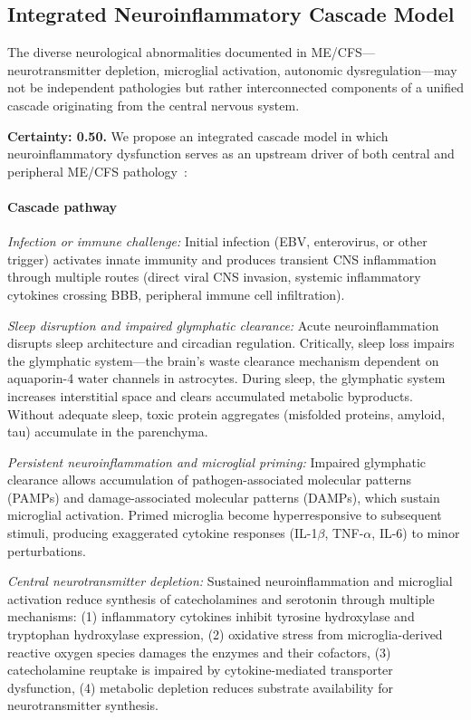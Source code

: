 \subsection{Integrated Neuroinflammatory Cascade Model}

The diverse neurological abnormalities documented in ME/CFS—neurotransmitter depletion, microglial activation, autonomic dysregulation—may not be independent pathologies but rather interconnected components of a unified cascade originating from the central nervous system.

\begin{hypothesis}
\label{hyp:cascade-neuroinflammatory}
\textbf{Certainty: 0.50.} We propose an integrated cascade model in which neuroinflammatory dysfunction serves as an upstream driver of both central and peripheral ME/CFS pathology~\cite{MCMC2024Neurometabolic,NIH2024MECFSRoadmap}:

\paragraph{Cascade pathway}

\textit{Infection or immune challenge:} Initial infection (EBV, enterovirus, or other trigger) activates innate immunity and produces transient CNS inflammation through multiple routes (direct viral CNS invasion, systemic inflammatory cytokines crossing BBB, peripheral immune cell infiltration).

\textit{Sleep disruption and impaired glymphatic clearance:} Acute neuroinflammation disrupts sleep architecture and circadian regulation. Critically, sleep loss impairs the glymphatic system---the brain's waste clearance mechanism dependent on aquaporin-4 water channels in astrocytes. During sleep, the glymphatic system increases interstitial space and clears accumulated metabolic byproducts. Without adequate sleep, toxic protein aggregates (misfolded proteins, amyloid, tau) accumulate in the parenchyma.

\textit{Persistent neuroinflammation and microglial priming:} Impaired glymphatic clearance allows accumulation of pathogen-associated molecular patterns (PAMPs) and damage-associated molecular patterns (DAMPs), which sustain microglial activation. Primed microglia become hyperresponsive to subsequent stimuli, producing exaggerated cytokine responses (IL-1$\beta$, TNF-$\alpha$, IL-6) to minor perturbations.

\textit{Central neurotransmitter depletion:} Sustained neuroinflammation and microglial activation reduce synthesis of catecholamines and serotonin through multiple mechanisms: (1) inflammatory cytokines inhibit tyrosine hydroxylase and tryptophan hydroxylase expression, (2) oxidative stress from microglia-derived reactive oxygen species damages the enzymes and their cofactors, (3) catecholamine reuptake is impaired by cytokine-mediated transporter dysfunction, (4) metabolic depletion reduces substrate availability for neurotransmitter synthesis.


\end{hypothesis}
